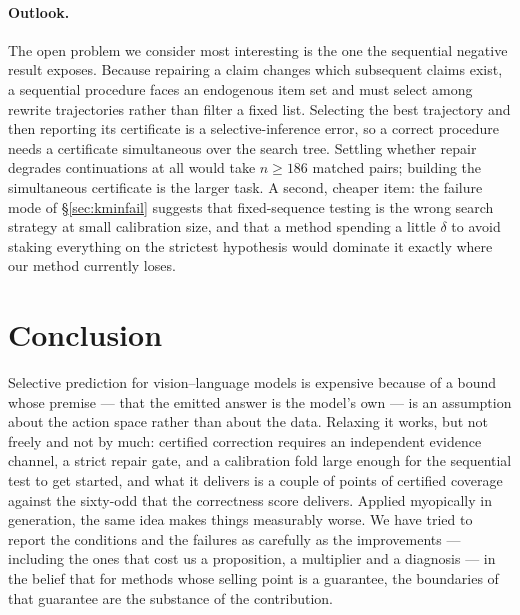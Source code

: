 \documentclass{article}
\theoremstyle{plain}
\theoremstyle{definition}
\theoremstyle{remark}
\begin{document}
\paragraph{Outlook.}
The open problem we consider most interesting is the one the sequential negative result exposes.
Because repairing a claim changes which subsequent claims exist, a sequential procedure faces an
endogenous item set and must select among rewrite trajectories rather than filter a fixed list.
Selecting the best trajectory and then reporting its certificate is a selective-inference error,
so a correct procedure needs a certificate simultaneous over the search tree. Settling whether
repair degrades continuations at all would take $n\ge186$ matched pairs; building the
simultaneous certificate is the larger task. A second, cheaper item: the failure mode of
\S\ref{sec:kminfail} suggests that fixed-sequence testing is the wrong search strategy at small
calibration size, and that a method spending a little $\delta$ to avoid staking everything on the
strictest hypothesis would dominate it exactly where our method currently loses.

\section{Conclusion}

Selective prediction for vision--language models is expensive because of a bound whose
premise --- that the emitted answer is the model's own --- is an assumption about the action
space rather than about the data. Relaxing it works, but not freely and not by much: certified
correction requires an independent evidence channel, a strict repair gate, and a calibration fold
large enough for the sequential test to get started, and what it delivers is a couple of points
of certified coverage against the sixty-odd that the correctness score delivers. Applied
myopically in generation, the same idea makes things measurably worse. We have tried to report the
conditions and the failures as carefully as the improvements --- including the ones that cost us a
proposition, a multiplier and a diagnosis --- in the belief that for methods whose selling point
is a guarantee, the boundaries of that guarantee are the substance of the contribution.
\end{document}
